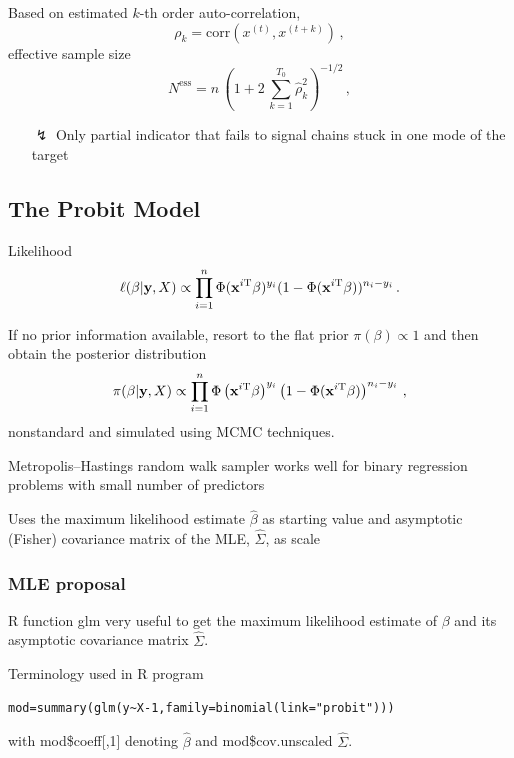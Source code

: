 \begin{slide}


\vs\pause
Based on estimated $k$-th order auto-correlation,
$$
\rho_k = \mathrm{corr}\left(x^{(t)},x^{(t+k)} \right)\,,
$$
effective sample size
\small$$
N^\text{ess} = n\,\left(1+2\,\sum_{k=1}^{T_0} \hat\rho_k^2\right)^{-1/2}\,,
$$\normalsize
\begin{enumerate}
\item[{\Large $\lightning$}] Only partial indicator that fails to signal
chains stuck in one mode of the target 
\end{enumerate}

\end{slide}\subsection{The Probit Model}\begin{slide}[label=Proful]

Likelihood\hyperlink{Probex}{}
$$
\ell(\beta|\mathbf{y},X)\propto \prod_{i=1}^n \Phi(\mathbf{x}^{i\mathrm{T}}\beta)^{y_i} (1-\Phi(\mathbf{x}^{i\mathrm{T}}\beta))^{n_i-y_i}\,.
$$

\pause If no prior information available, resort to the flat prior 
$\pi(\beta)\propto 1$ and then obtain the posterior distribution
$$
\pi(\beta|\mathbf{y},X) \propto \prod_{i=1}^n \Phi\left(\mathbf{x}^{i\mathrm{T}}\beta\right)^{y_i}\left(1-\Phi(\mathbf{x}^{i\mathrm{T}}\beta)\right)^{n_i-y_i}\,,
$$
nonstandard and simulated using MCMC techniques.

\end{slide}\begin{slide} 

\vs Metropolis--Hastings random walk sampler works well for binary regression problems with
small number of predictors

\vs Uses the maximum likelihood estimate
$\hat\beta$ as starting value and asymptotic (Fisher)
covariance matrix of the MLE, $\hat\Sigma$, as scale

\end{slide}
\begin{frame}[fragile]
\frametitle{MLE proposal}

{\sf R} function {\sf glm} very useful to get the maximum likelihood estimate of $\beta$ 
and its asymptotic covariance matrix $\hat\Sigma$.

\vs Terminology used in {\sf R} program\small
\begin{verbatim}
mod=summary(glm(y~X-1,family=binomial(link="probit")))
\end{verbatim}\normalsize 
with {\sf mod{\$}coeff[,1]} denoting $\hat\beta$ and {\sf mod{\$}cov.unscaled} $\hat\Sigma$.

\end{frame}
